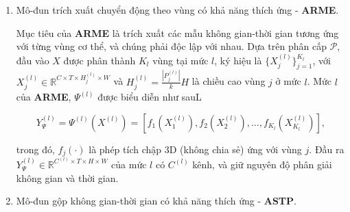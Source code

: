 \begin{enumerate}
          \begin{align}
              Y =  \biggl[ & Y^{M}, \Gamma^{(L-1)}\left(Y^{(L-1)}\right),  \ldots , \nonumber                                                                         \\
                           & \Gamma^{(l_{\Omega})}\left(Y_{\Omega}^{(l_{\Omega})}\right), \Gamma^{(2)}\left(Y^{(2)}\right), \Gamma^{(1)}\left(Y^{(1)}\right) \biggl],
          \end{align}

          Sau đó, $Y$ được truyền qua các lớp kết nối đầy đủ (\textbf{FC}), trước khi tối ưu bằng tổ hợp hàm mất mát bộ ba $\mathcal{L}_{tri}$ và hàm mất mát entropy chéo $\mathcal{L}_{ce}$.

    \item Mô-đun trích xuất chuyển động theo vùng có khả năng thích ứng - \textbf{ARME}.

          Mục tiêu của \textbf{ARME} là trích xuất các mẫu không gian-thời gian tương ứng với từng vùng cơ thể, và chúng phải độc lập với nhau. Dựa trên phân cấp $\mathcal{P}$, đầu vào $X$ được phân thành $K_l$ vùng tại mức $l$, ký hiệu là $\{X_{j}^{(l)}\}_{j=1}^{K_l}$, với $X_{j}^{(l)} \in \mathbb{R}^{C \times T \times H_j^{(l)} \times W}$ và $H^{(l)}_j=\frac{\left|P_j^{(l)}\right|}{k}H$ là chiều cao vùng $j$ ở mức $l$. Mức $l$ của \textbf{ARME}, $\Psi^{(l)}$ được biểu diễn như sauL

          \begin{equation}
              Y^{(l)}_{\Psi}=\Psi^{(l)}(X^{(l)})=\left[f_{1}(X_{1}^{(l)}), f_{2}(X_{2}^{(l)}) ,\ldots, f_{K_l}(X_{K_l}^{(l)})  \right],
          \end{equation}

          trong đó, $f_{j}\left(\cdot\right)$ là phép tích chập 3D (không chia sẻ) ứng với vùng $j$. Đầu ra $Y^{(l)}_{\Psi} \in \mathbb{R}^{C^{(l)} \times T \times H \times W}$ của mức $l$ có $C^{(l)}$ kênh, và giữ nguyên độ phân giải không gian và thời gian.

    \item Mô-đun gộp không gian-thời gian có khả năng thích ứng - \textbf{ASTP}.


\end{enumerate}
